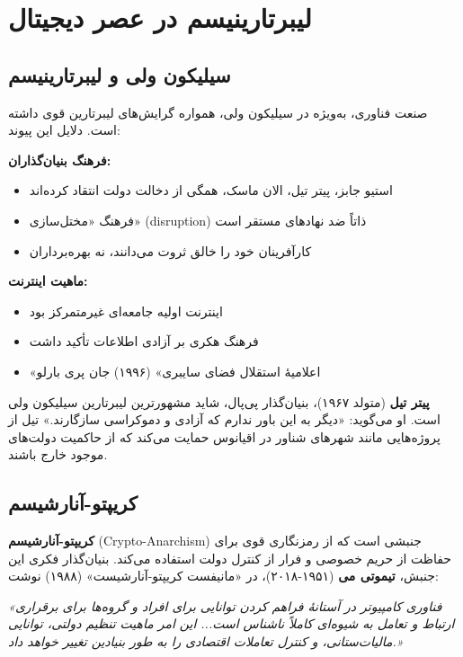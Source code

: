 \section{لیبرتارینیسم در عصر دیجیتال}

\subsection{سیلیکون ولی و لیبرتارینیسم}


صنعت فناوری، به‌ویژه در سیلیکون ولی، همواره گرایش‌های لیبرتارین قوی داشته است. دلایل این پیوند:

\textbf{فرهنگ بنیان‌گذاران:}
\begin{itemize}
    \item استیو جابز، پیتر تیل، الان ماسک، همگی از دخالت دولت انتقاد کرده‌اند
    \item فرهنگ «مختل‌سازی» (disruption) ذاتاً ضد نهادهای مستقر است
    \item کارآفرینان خود را خالق ثروت می‌دانند، نه بهره‌برداران
\end{itemize}

\textbf{ماهیت اینترنت:}
\begin{itemize}
    \item اینترنت اولیه جامعه‌ای غیرمتمرکز بود
    \item فرهنگ هکری بر آزادی اطلاعات تأکید داشت
    \item «اعلامیهٔ استقلال فضای سایبری» (۱۹۹۶) جان پری بارلو
\end{itemize}

\textbf{پیتر تیل} (متولد ۱۹۶۷)، بنیان‌گذار پی‌پال، شاید مشهورترین لیبرتارین سیلیکون ولی است. او می‌گوید: «دیگر به این باور ندارم که آزادی و دموکراسی سازگارند.» تیل از پروژه‌هایی مانند شهرهای شناور در اقیانوس حمایت می‌کند که از حاکمیت دولت‌های موجود خارج باشند.

\subsection{کریپتو-آنارشیسم}

\begin{tcolorbox}[
    enhanced,
    colback=rightblue!8,
    colframe=rightblue,
    boxrule=1.5pt,
    arc=5pt,
    fonttitle=\bfseries,
    title={\rl{🔵 مفهوم کلیدی: کریپتو-آنارشیسم}}
]
\textbf{کریپتو-آنارشیسم} (Crypto-Anarchism) جنبشی است که از رمزنگاری قوی برای حفاظت از حریم خصوصی و فرار از کنترل دولت استفاده می‌کند. بنیان‌گذار فکری این جنبش، \textbf{تیموتی می} (۱۹۵۱-۲۰۱۸)، در «مانیفست کریپتو-آنارشیست» (۱۹۸۸) نوشت:

\textit{«فناوری کامپیوتر در آستانهٔ فراهم کردن توانایی برای افراد و گروه‌ها برای برقراری ارتباط و تعامل به شیوه‌ای کاملاً ناشناس است... این امر ماهیت تنظیم دولتی، توانایی مالیات‌ستانی، و کنترل تعاملات اقتصادی را به طور بنیادین تغییر خواهد داد.»}
\end{tcolorbox}


